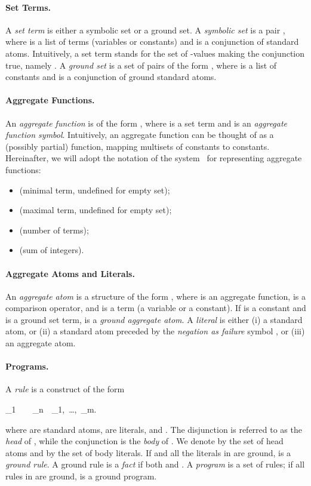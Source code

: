 \documentclass{tlp}
\begin{document}
\paragraph{Set Terms.}
A {\em set term} is either a symbolic set or a ground set.
A {\em symbolic set} is a pair , where  is a list of terms (variables or constants) and  is a conjunction of standard atoms.
Intuitively, a set term  stands for the set of -values making the conjunction  true, namely .
A {\em ground set} is a set of pairs of the form , where  is a list of constants and  is a conjunction of ground standard atoms.


\paragraph{Aggregate Functions.}
An {\em aggregate function} is of the form , where  is a set term and  is an {\em aggregate function symbol}.
Intuitively, an aggregate function can be thought of as a (possibly partial) function, mapping multisets of constants to constants.
Hereinafter, we will adopt the notation of the \dlv system~\cite{leon-etal-2002-dlv} for representing aggregate functions:
\begin{itemize}
\item {} (minimal term, undefined for empty set);
\item {} (maximal term, undefined for empty set);
\item {} (number of terms);
\item {} (sum of integers).
\end{itemize}


\paragraph{Aggregate Atoms and Literals.}
An {\em aggregate atom} is a structure of the form , where  is an aggregate function,  is a comparison operator, and  is a term (a variable or a constant).
If  is a constant and  is a ground set term,  is a {\em ground aggregate atom}.
A {\em literal} is either
(i) a standard atom, or
(ii) a standard atom preceded by the {\em negation as failure} symbol , or
(iii) an aggregate atom.


\paragraph{Programs.}
A {\em rule} \R{} is a construct of the form
\begin{dlvcode}
\alpha_1\ \Or\ \cdots\ \Or\ \alpha_n\ \derives\ \ell_1,\ \ldots,\ \ell_m.
\end{dlvcode}\noindent where  are standard atoms,  are literals,  and .
The disjunction  is referred to as the {\em head} of \R{}, while the conjunction  is the {\em body} of \R{}.
We denote by  the set of head atoms and by  the set of body literals.
If  and all the literals in  are ground,  is a {\em ground rule}.
A ground rule  is a {\em fact} if both  and .
A {\em program}  is a set of rules; if all rules in  are ground,  is a ground program.
\end{document}
